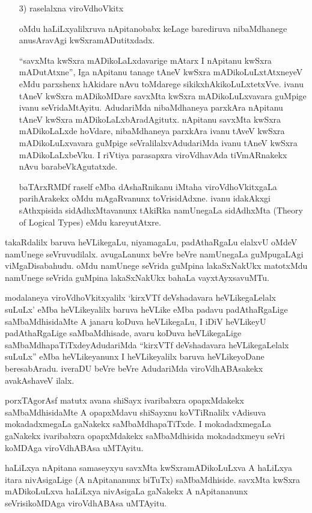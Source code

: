\begin{itemize}
\item[{\rm 3)}] raselalxna viroVdhoVkitx

oMdu haLiLxyalilxruva nApitanobabx keLage barediruva nibaMdhanege anusAra\-vAgi kwSxramADutitxdadx.

``savxMta kwSxra mADikoLaLxdavarige mAtarx I nApitanu kwSxra mADutAtxne'', Iga nApitanu tanage tAneV kwSxra mADikoLuLxtAtxneyeV eMdu parxshenx hAkidare nAvu toMdarege sikikxhAkikoLuLxtetxVve. ivanu tAneV kwSxra mADikoMDare savxMta kwSxra mADikoLuLxvavara guMpige ivanu seVridaMtAyitu. AdudariMda nibaMdhaneya parxkAra nApitanu tAneV kwSxra mADikoLaLxbAradAgitutx. nApitanu savxMta kwSxra mADikoLaLxde hoVdare, nibaMdhaneya parxkAra ivanu tAveV kwSxra mADikoLuLxvavara guMpige seVralilalxvAdudariMda ivanu tAneV kwSxra mADikoLaLxbeVku. I riVtiya parasapxra viroVdhavAda tiVmARnakekx nAvu barabeVkAgutatxde.

baTArxRMDf raself eMba dAshaRnikanu iMtaha viroVdhoVkitxgaLa parihArakekx oMdu mAgaRvanunx toVrisidAdxne. ivanu idakAkxgi sAthxpisida sidAdhxMtavanunx tAkiRka namUnegaLa sidAdhxMta {\rm (Theory of Logical Types)} eMdu kareyutAtxre.
\end{itemize}

takaRdalilx baruva heVLikegaLu, niyamagaLu, padAthaRgaLu elalxvU oMdeV namUnege seVruvudilalx. avugaLanunx beVre beVre namUnegaLa guMpugaLAgi viMgaDisabahudu. oMdu namUnege seVrida guMpina lakaSxNakUkx matotxMdu namUnege seVrida guMpina lakaSxNakUkx bahaLa vayxtAyxsavuMTu.

modalaneya viroVdhoVkitxyalilx `kirxVTf deVshadavara heVLikegaLelalx suLuLx' eMba heVLikeyalilx baruva heVLike eMba padavu padAthaRgaLige saMbaMdhisidaMte A janaru koDuva heVLikegaLu, I iDiV heVLikeyU padAthaRgaLige saMbaMdhisade, avaru koDuva heVLikegaLige saMbaMdhapaTiTxdeyAdudariMda ``kirxVTf deVshadavara heVLikegaLelalx suLuLx'' eMba heVLikeyanunx I heVLikeyalilx baruva heVLikeyoDane beresabAradu. iveraDU beVre beVre AdudariMda viroVdhABAsakekx avakAshaveV ilalx.

porxTAgorAsf matutx avana shiSayx ivaribabxra opapxMdakekx saMbaMdhisidaMte A opapxMdavu shiSayxnu koVTiRnalilx vAdisuva mokadadxmegaLa gaNakekx saMbaMdhapaTiTxde. I mokadadxmegaLa gaNakekx ivaribabxra opapxMdakekx saMbaMdhisida mokadadxmeyu seVri koMDAga viroVdhABAsa uMTAyitu.

haLiLxya nApitana samaseyxyu savxMta kwSxramADikoLuLxva A haLiLxya itara nivAsigaLige (A nApitananunx biTuTx) saMbaMdhiside. savxMta kwSxra mADikoLuLxva haLiLxya nivAsigaLa gaNakekx A nApitananunx seVrisikoMDAga viroVdhABAsa uMTAyitu.

